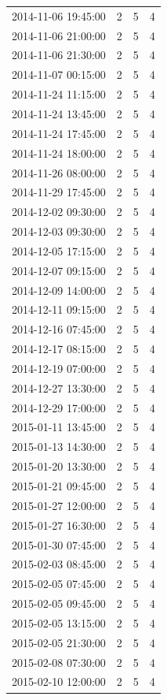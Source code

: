 \begin{tabular}{lrrr}
2014-11-06 19:45:00 & 2 & 5 & 4 \\
2014-11-06 21:00:00 & 2 & 5 & 4 \\
2014-11-06 21:30:00 & 2 & 5 & 4 \\
2014-11-07 00:15:00 & 2 & 5 & 4 \\
2014-11-24 11:15:00 & 2 & 5 & 4 \\
2014-11-24 13:45:00 & 2 & 5 & 4 \\
2014-11-24 17:45:00 & 2 & 5 & 4 \\
2014-11-24 18:00:00 & 2 & 5 & 4 \\
2014-11-26 08:00:00 & 2 & 5 & 4 \\
2014-11-29 17:45:00 & 2 & 5 & 4 \\
2014-12-02 09:30:00 & 2 & 5 & 4 \\
2014-12-03 09:30:00 & 2 & 5 & 4 \\
2014-12-05 17:15:00 & 2 & 5 & 4 \\
2014-12-07 09:15:00 & 2 & 5 & 4 \\
2014-12-09 14:00:00 & 2 & 5 & 4 \\
2014-12-11 09:15:00 & 2 & 5 & 4 \\
2014-12-16 07:45:00 & 2 & 5 & 4 \\
2014-12-17 08:15:00 & 2 & 5 & 4 \\
2014-12-19 07:00:00 & 2 & 5 & 4 \\
2014-12-27 13:30:00 & 2 & 5 & 4 \\
2014-12-29 17:00:00 & 2 & 5 & 4 \\
2015-01-11 13:45:00 & 2 & 5 & 4 \\
2015-01-13 14:30:00 & 2 & 5 & 4 \\
2015-01-20 13:30:00 & 2 & 5 & 4 \\
2015-01-21 09:45:00 & 2 & 5 & 4 \\
2015-01-27 12:00:00 & 2 & 5 & 4 \\
2015-01-27 16:30:00 & 2 & 5 & 4 \\
2015-01-30 07:45:00 & 2 & 5 & 4 \\
2015-02-03 08:45:00 & 2 & 5 & 4 \\
2015-02-05 07:45:00 & 2 & 5 & 4 \\
2015-02-05 09:45:00 & 2 & 5 & 4 \\
2015-02-05 13:15:00 & 2 & 5 & 4 \\
2015-02-05 21:30:00 & 2 & 5 & 4 \\
2015-02-08 07:30:00 & 2 & 5 & 4 \\
2015-02-10 12:00:00 & 2 & 5 & 4 \\

\end{tabular}
